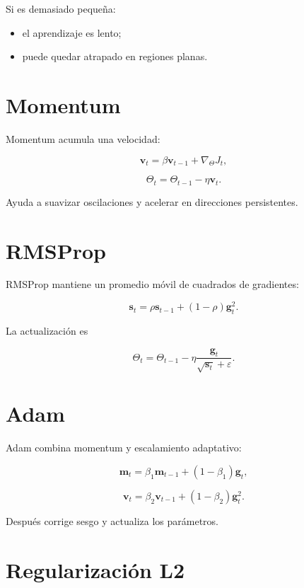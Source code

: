 \documentclass[
  spanish,
  10.5pt,
  letterpaper,
  DIV=11,
  numbers=noendperiod,
  oneside,
  open=any]{scrreprt}
\providecommand{\tightlist}{%
  \setlength{\itemsep}{0pt}\setlength{\parskip}{0pt}}
\theoremstyle{definition}
\theoremstyle{definition}
\theoremstyle{plain}
\theoremstyle{remark}
\begin{document}
Si es demasiado pequeña:

\begin{itemize}
\tightlist
\item
  el aprendizaje es lento;
\item
  puede quedar atrapado en regiones planas.
\end{itemize}

\section*{Momentum}\label{momentum}


Momentum acumula una velocidad:

\[
\mathbf{v}_t
=
\beta\mathbf{v}_{t-1}
+
\nabla_{\Theta}J_t,
\]

\[
\Theta_t
=
\Theta_{t-1}
-
\eta\mathbf{v}_t.
\]

Ayuda a suavizar oscilaciones y acelerar en direcciones persistentes.

\section*{RMSProp}\label{rmsprop}


RMSProp mantiene un promedio móvil de cuadrados de gradientes:

\[
\mathbf{s}_t
=
\rho\mathbf{s}_{t-1}
+
(1-\rho)
\mathbf{g}_t^2.
\]

La actualización es

\[
\Theta_t
=
\Theta_{t-1}
-
\eta
\frac{\mathbf{g}_t}
{\sqrt{\mathbf{s}_t}+\varepsilon}.
\]

\section*{Adam}\label{adam}


Adam combina momentum y escalamiento adaptativo:

\[
\mathbf{m}_t
=
\beta_1\mathbf{m}_{t-1}
+
(1-\beta_1)\mathbf{g}_t,
\]

\[
\mathbf{v}_t
=
\beta_2\mathbf{v}_{t-1}
+
(1-\beta_2)\mathbf{g}_t^2.
\]

Después corrige sesgo y actualiza los parámetros.

\section*{Regularización L2}\label{regularizaciuxf3n-l2-1}
\end{document}
